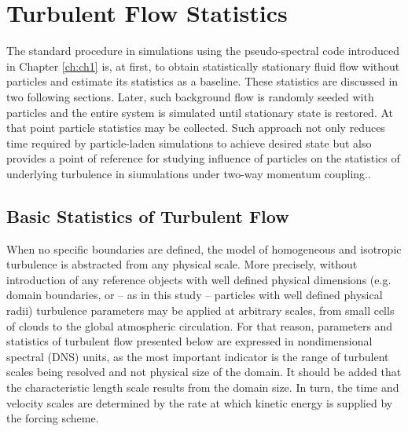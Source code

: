 \documentclass{pracamgren}
\begin{document}
\section{Turbulent Flow Statistics}
\label{sc:ch2.flow}

The standard procedure in simulations using the pseudo-spectral code introduced in Chapter \ref{ch:ch1} is, at first, to obtain statistically stationary fluid flow without particles and estimate its statistics as a baseline.
These statistics are discussed in two following sections.
Later, such background flow is randomly seeded with particles and the entire system is simulated until stationary state is restored.
At that point particle statistics may be collected.
Such approach not only reduces time required by particle-laden simulations to achieve desired state but also provides a point of reference for studying influence of particles on the statistics of underlying turbulence in siumulations under two-way momentum coupling..



\subsection{Basic Statistics of Turbulent Flow}
\label{ssc:ch2.flow.bstat}

When no specific boundaries are defined, the model of homogeneous and isotropic turbulence is abstracted from any physical scale. 
More precisely, without introduction of any reference objects with well defined physical dimensions (e.g. domain boundaries, or -- as in this study -- particles with well defined physical radii) turbulence parameters may be applied at arbitrary scales, from small cells of clouds to the global atmospheric circulation.
For that reason, parameters and statistics of turbulent flow presented below are expressed in nondimensional spectral (DNS) units, as the most important indicator is the range of turbulent scales being resolved and not physical size of the domain.
It should be added that the characteristic length scale results from the domain size. 
In turn, the time and velocity scales are determined by the rate at which kinetic energy is supplied by the forcing scheme.
\end{document}
